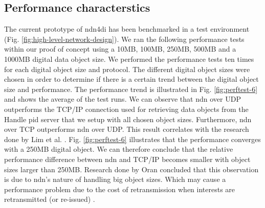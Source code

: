 \documentclass[conference]{IEEEtran}
\begin{document}




\subsection{Performance characterstics}
The current prototype of \gls{ndn4di} has been benchmarked in a test environment (Fig. \ref{fig:high-level-network-design}). We ran the following performance tests within our proof of concept using a 10MB, 100MB, 250MB, 500MB and a 1000MB digital data object size. We performed the performance tests ten times for each digital object size and protocol. The different digital object sizes were chosen in order to determine if there is a certain trend between the digital object size and performance. The performance trend is illustrated in Fig. \ref{fig:perftest-6} and shows the average of the test runs. We can observe that \gls{ndn} over UDP outperforms the TCP/IP connection used for retrieving data objects from the Handle \gls{pid} server that we setup with all chosen object sizes. Furthermore, \gls{ndn} over TCP outperforms \gls{ndn} over UDP. This result correlates with the research done by Lim et al. \cite{lim2018ndn}. Fig. \ref{fig:perftest-6} illustrates that the performance converges with a 250MB digital object. We can therefore conclude that the relative performance difference between \gls{ndn} and TCP/IP becomes smaller with object sizes larger than 250MB. Research done by Oran concluded that this observation is due to \gls{ndn}'s nature of handling big object sizes. Which may cause a performance problem due to the cost of retransmission when interests are retransmitted (or re-issued) \cite{ndn-objects}.
\end{document}
